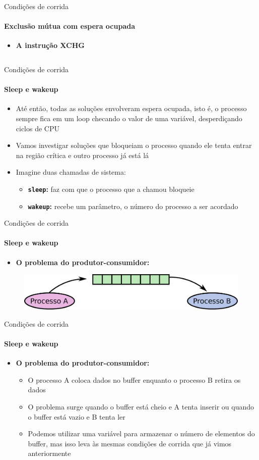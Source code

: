 \documentclass{beamer}
\begin{document}
\begin{frame}{Condições de corrida}
	\framesubtitle{Exclusão mútua com espera ocupada}
	\begin{itemize}
		\item \textbf{A instrução XCHG}
		\inputminted{c}{resources/xchg.asm}
	\end{itemize}
\end{frame}
\begin{frame}{Condições de corrida}
	\framesubtitle{Sleep e wakeup}
	\begin{itemize}
		\item Até então, todas as soluções envolveram espera ocupada, isto é, o processo sempre fica em um loop checando o valor de uma variável, desperdiçando ciclos de CPU
		\item Vamos investigar soluções que bloqueiam o processo quando ele tenta entrar na região crítica e outro processo já está lá
		\item Imagine duas chamadas de sistema:
		\begin{itemize}
			\item \textbf{\texttt{sleep}:} faz com que o processo que a chamou bloqueie
			\item \textbf{\texttt{wakeup}:} recebe um parâmetro, o número do processo a ser acordado
		\end{itemize}
	\end{itemize}
\end{frame}
\begin{frame}{Condições de corrida}
	\framesubtitle{Sleep e wakeup}
	\begin{itemize}
		\item \textbf{O problema do produtor-consumidor:}
	\end{itemize}
	\begin{figure}
		\includegraphics[width=0.8\paperwidth]{resources/producerconsumer}
	\end{figure}
\end{frame}
\begin{frame}{Condições de corrida}
	\framesubtitle{Sleep e wakeup}
	\begin{itemize}
		\item \textbf{O problema do produtor-consumidor:}
		\begin{itemize}
			\item O processo A coloca dados no buffer enquanto o processo B retira os dados
			\item O problema surge quando o buffer está cheio e A tenta inserir ou quando o buffer está vazio e B tenta ler
			\item Podemos utilizar uma variável para armazenar o número de elementos do buffer, mas isso leva às mesmas condições de corrida que já vimos anteriormente
		\end{itemize}
	\end{itemize}
\end{frame}
\end{document}
